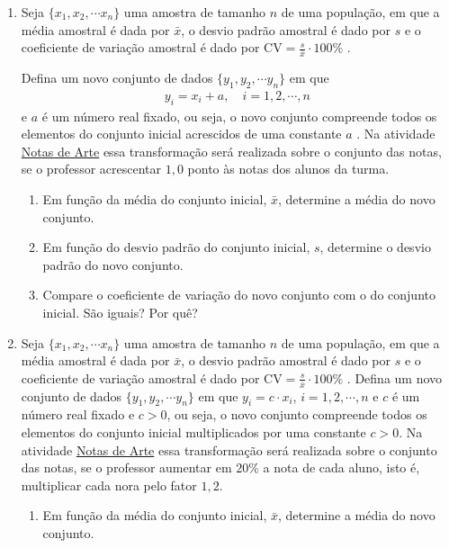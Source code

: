 \begin{enumerate}
\begin{enumerate}
\end{enumerate}

\item Seja \(\{x_1,x_2,\cdots x_n\}\) uma amostra de tamanho \(n\) de uma população, em que a média amostral é dada por \(\bar{x}\), o desvio padrão amostral é dado por \(s\) e o coeficiente de variação amostral é dado por \(\text{CV}=\frac{s}{\bar{x}}\cdot 100\%\) .

Defina um novo conjunto de dados \(\{y_1,y_2,\cdots y_n\}\) em que
\begin{equation*}
\begin{split}y_i=x_i+a,\quad  i=1,2,\cdots, n\end{split}
\end{equation*}
e \(a\) é um número real fixado, ou seja, o novo conjunto compreende todos os elementos do conjunto inicial acrescidos de uma constante \(a\) . Na atividade \hyperref[\detokenize{PE104-0:ativ-notas-de-artes}]{Notas de Arte} essa transformação será realizada sobre o conjunto das notas, se o professor acrescentar $1{,}0$ ponto às notas dos alunos da turma.
\begin{enumerate}
\item {} 
Em função da média do conjunto inicial, \(\bar{x}\), determine a média do novo conjunto.

\item {} 
Em função do desvio padrão do conjunto inicial, \(s\), determine o desvio padrão do novo conjunto.

\item {} 
Compare o coeficiente de variação do novo conjunto com o do conjunto inicial. São iguais? Por quê?

\end{enumerate}

\item Seja \(\{x_1,x_2,\cdots x_n\}\) uma amostra de tamanho \(n\) de uma população, em que a média amostral é dada por \(\bar{x}\), o desvio padrão amostral é dado por \(s\) e o coeficiente de variação amostral é dado por \(\text{CV}=\frac{s}{\bar{x}}\cdot 100\%\) . Defina um novo conjunto de dados \(\{y_1,y_2,\cdots y_n\}\) em que \(y_i=c\cdot x_i\), \(i=1,2,\cdots, n\) e \(c\) é um número real fixado e \(c>0\), ou seja, o novo conjunto compreende todos os elementos do conjunto inicial multiplicados por uma constante \(c>0.\) Na atividade \hyperref[\detokenize{PE104-0:ativ-notas-de-artes}]{Notas de Arte} essa transformação será realizada sobre o conjunto das notas, se o professor aumentar em $20\%$ a nota de cada aluno, isto é, multiplicar cada nora pelo fator $1{,}2$.
\begin{enumerate}
\item {} 
Em função da média do conjunto inicial, \(\bar{x}\), determine a média do novo conjunto.


\end{enumerate}
\end{enumerate}
